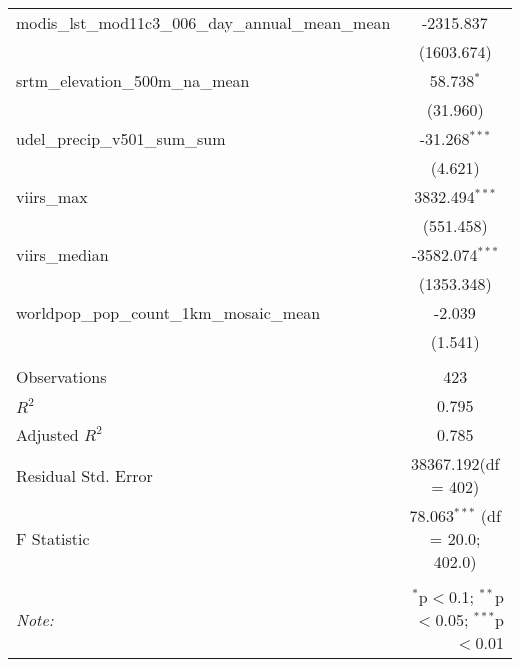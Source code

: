 \begin{table}[!htbp]
\begin{tabular}{@{\extracolsep{5pt}}lc}
 modis_lst_mod11c3_006_day_annual_mean_mean & -2315.837$^{}$ \\
  & (1603.674) \\
 srtm_elevation_500m_na_mean & 58.738$^{*}$ \\
  & (31.960) \\
 udel_precip_v501_sum_sum & -31.268$^{***}$ \\
  & (4.621) \\
 viirs_max & 3832.494$^{***}$ \\
  & (551.458) \\
 viirs_median & -3582.074$^{***}$ \\
  & (1353.348) \\
 worldpop_pop_count_1km_mosaic_mean & -2.039$^{}$ \\
  & (1.541) \\
\hline \\[-1.8ex]
 Observations & 423 \\
 $R^2$ & 0.795 \\
 Adjusted $R^2$ & 0.785 \\
 Residual Std. Error & 38367.192(df = 402)  \\
 F Statistic & 78.063$^{***}$ (df = 20.0; 402.0) \\
\hline
\hline \\[-1.8ex]
\textit{Note:} & \multicolumn{1}{r}{$^{*}$p$<$0.1; $^{**}$p$<$0.05; $^{***}$p$<$0.01} \\
\end{tabular}
\end{table}